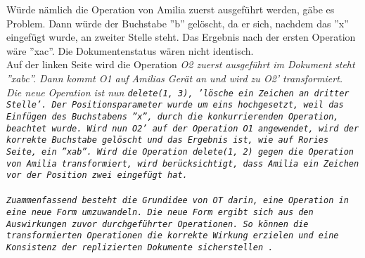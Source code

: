 %
Würde nämlich die Operation von Amilia zuerst ausgeführt werden, gäbe es Problem. Dann würde der Buchstabe ''b'' gelöscht, da er sich, nachdem das ''x'' eingefügt wurde, an zweiter Stelle steht. Das Ergebnis nach der ersten Operation wäre ''xac''. Die Dokumentenstatus wären nicht identisch.\\
%
Auf der linken Seite wird die Operation \it{O2} zuerst ausgeführt im Dokument steht ''xabc''. Dann kommt \it{O1} auf Amilias Gerät an und wird zu \it{O2'} transformiert. Die neue Operation ist nun \tt{delete(1, 3)}, 'lösche ein Zeichen an dritter Stelle'. Der Positionsparameter wurde um eins hochgesetzt, weil das Einfügen des Buchstabens ''x'', durch die konkurrierenden Operation, beachtet wurde. Wird nun \it{O2'} auf der Operation \it{O1} angewendet, wird der korrekte Buchstabe gelöscht und das Ergebnis ist, wie auf Rories Seite, ein ''xab''.
Wird die Operation \tt{delete(1, 2)} gegen die Operation von Amilia transformiert, wird berücksichtigt, dass Amilia ein Zeichen vor der Position zwei eingefügt hat.\\\\
%
%
Zuammenfassend besteht die Grundidee von \gls{OT} darin, eine Operation in eine neue Form umzuwandeln. Die neue Form ergibt sich aus den Auswirkungen zuvor durchgeführter Operationen. So können die transformierten Operationen die korrekte Wirkung erzielen und eine Konsistenz der replizierten Dokumente sicherstellen~\cite{ot-later}.
%
%
